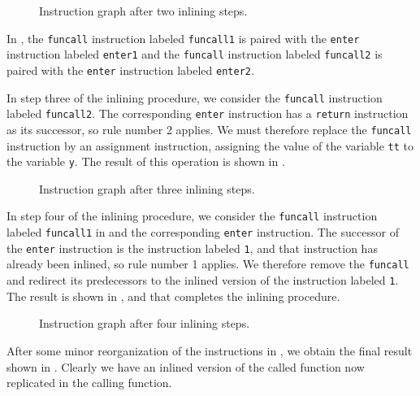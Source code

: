 \begin{figure}
\begin{center}
\end{center}
\caption{\label{fig44}
Instruction graph after two inlining steps.}
\end{figure}

In , the \texttt{funcall} instruction labeled
\texttt{funcall1} is paired with the \texttt{enter} instruction
labeled \texttt{enter1} and the \texttt{funcall} instruction labeled
\texttt{funcall2} is paired with the \texttt{enter} instruction
labeled \texttt{enter2}.

In step three of the inlining procedure, we consider the
\texttt{funcall} instruction labeled \texttt{funcall2}.  The
corresponding \texttt{enter} instruction has a \texttt{return}
instruction as its successor, so rule number 2 applies.  We must
therefore replace the \texttt{funcall} instruction by an assignment
instruction, assigning the value of the variable \texttt{tt} to the
variable \texttt{y}.  The result of this operation is shown in
.

\begin{figure}
\begin{center}
\end{center}
\caption{\label{fig45}
Instruction graph after three inlining steps.}
\end{figure}

In step four of the inlining procedure, we consider the
\texttt{funcall} instruction labeled \texttt{funcall1} in
 and the corresponding \texttt{enter} instruction. The
successor of the \texttt{enter} instruction is the instruction labeled
\texttt{1}, and that instruction has already been inlined, so rule
number 1 applies.  We therefore remove the \texttt{funcall} and
redirect its predecessors to the inlined version of the instruction
labeled \texttt{1}.  The result is shown in , and that
completes the inlining procedure.

\begin{figure}
\begin{center}
\end{center}
\caption{\label{fig46}
Instruction graph after four inlining steps.}
\end{figure}

After some minor reorganization of the instructions in ,
we obtain the final result shown in .  Clearly we have an
inlined version of the called function now replicated in the calling
function.

